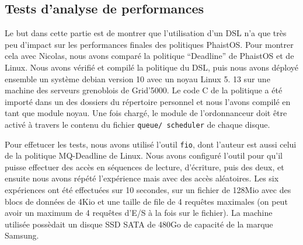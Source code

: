 \subsection{Tests d'analyse de performances}

Le but dans cette partie est de montrer que l'utilisation d'un DSL n'a que très 
peu d'impact sur les performances finales des politiques PhaistOS. Pour 
montrer cela avec Nicolas, nous avons comparé la politique ``Deadline'' de 
PhaistOS et de Linux. Nous avons vérifié et compilé la politique du DSL, puis 
nous avons déployé ensemble un système debian version 10 avec un noyau Linux 5.
13 sur une machine des serveurs grenoblois de Grid'5000. Le code C de la 
politique a été importé dans un des dossiers du répertoire personnel et nous 
l'avons compilé en tant que module noyau. Une fois chargé, le module de 
l'ordonnanceur doit être activé à travers le contenu du fichier \texttt{queue/
scheduler} de chaque disque.

Pour effetucer les tests, nous avons utilisé l'outil \texttt{fio}, dont 
l'auteur est aussi celui de la politique MQ-Deadline de Linux. Nous avons 
configuré l'outil pour qu'il puisse effectuer des accès en séquences de 
lecture, d'écriture, puis des deux, et ensuite nous avons répété l'expérience 
mais avec des accès aléatoires. Les six expériences ont été effectuées sur 10 
secondes, sur un fichier de 128Mio avec des blocs de données de 4Kio et une 
taille de file de 4 requêtes maximales (on peut avoir un maximum de 4 requêtes 
d'E/S à la fois sur le fichier). La machine utilisée possèdait un disque SSD 
SATA de 480Go de capacité de la marque Samsung.

